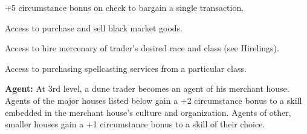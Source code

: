 {\begin{itemize*}
\item +5 circumstance bonus on  check to bargain a single transaction.
\item Access to purchase and sell black market goods.
\item Access to hire mercenary of trader's desired race and class (see Hirelings).
\item Access to purchasing spellcasting services from a particular class.
\end{itemize*}






\textbf{Agent:} At 3rd level, a dune trader becomes an agent of his merchant house. Agents of the major houses listed below gain a +2 circumstance bonus to a skill embedded in the merchant house's culture and organization. Agents of other, smaller houses gain a +1 circumstance bonus to a skill of their choice.

}
